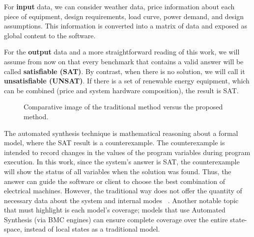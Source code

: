 \documentclass[a4paper,donotrepeattitle,fleqn]{cas-dc}
\begin{document}
For \textbf{input} data, we can consider weather data, price information about each piece of equipment, design requirements, load curve, power demand, and design assumptions. This information is converted into a matrix of data and exposed as global content to the software.

For the \textbf{output} data and a more straightforward reading of this work, we will assume from now on that every benchmark that contains a valid answer will be called \textbf{satisfiable (SAT)}. By contrast, when there is no solution, we will call it \textbf{unsatisfiable (UNSAT)}. If there is a set of renewable energy equipment, which can be combined (price and system hardware composition), the result is SAT.

\begin{figure}[ht]
\begin{center}
\end{center}
\caption{Comparative image of the traditional method versus the proposed method.}
\label{fig:optimization}
\end{figure}
  
The automated synthesis technique is mathematical reasoning about a formal model, where the SAT result is a counterexample. The counterexample is intended to record changes in the values of the program variables during program execution. In this work, since the system's answer is SAT, the counterexample will show the status of all variables when the solution was found. Thus, the answer can guide the software or client to choose the best combination of electrical machines. However, the traditional way does not offer the quantity of necessary data about the system and internal modes ~\cite{Benatiallah2017,Pradhan,Swarnkar}. Another notable topic that must highlight is each model's coverage; models that use Automated Synthesis (via BMC engines) can ensure complete coverage over the entire state-space, instead of local states as a traditional model.
\end{document}
